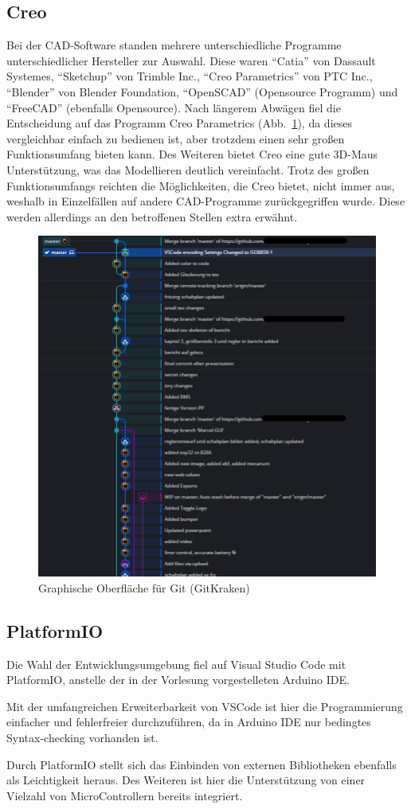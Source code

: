 \subsection{Creo}
Bei der CAD-Software standen mehrere unterschiedliche Programme unterschiedlicher Hersteller zur Auswahl.
Diese waren ``Catia'' von Dassault Systemes, ``Sketchup'' von Trimble Inc., ``Creo Parametrics'' von PTC Inc., ``Blender'' von Blender Foundation, ``OpenSCAD'' (Opensource Programm) und ``FreeCAD'' (ebenfalls Opensource).
Nach längerem Abwägen fiel die Entscheidung auf das Programm Creo Parametrics (Abb.~\ref{bild:gitkraken}), da dieses vergleichbar einfach zu bedienen ist, aber trotzdem einen sehr großen Funktionsumfang bieten kann.
Des Weiteren bietet Creo eine gute 3D-Maus Unterstützung, was das Modellieren deutlich vereinfacht.
Trotz des großen Funktionsumfangs reichten die Möglichkeiten, die Creo bietet, nicht immer aus, weshalb in Einzelfällen auf andere CAD-Programme zurückgegriffen wurde. Diese werden allerdings an den betroffenen Stellen extra erwähnt. 
\begin{figure}[!ht]
	\centering
	\includegraphics[width=\textwidth]{bilder/GitKrakenUebersicht.png}
	\caption{Graphische Oberfläche für Git (GitKraken)}
	\label{bild:gitkraken}
\end{figure}

\subsection{PlatformIO}
Die Wahl der Entwicklungsumgebung fiel auf Visual Studio Code mit PlatformIO, anstelle der in der Vorlesung vorgestelleten Arduino IDE.

Mit der umfangreichen Erweiterbarkeit von VSCode ist hier die Programmierung einfacher und fehlerfreier durchzuführen, da in Arduino IDE nur bedingtes Syntax-checking vorhanden ist.

Durch PlatformIO stellt sich das Einbinden von externen Bibliotheken ebenfalls als Leichtigkeit heraus.
Des Weiteren ist hier die Unterstützung von einer Vielzahl von MicroControllern bereits integriert.